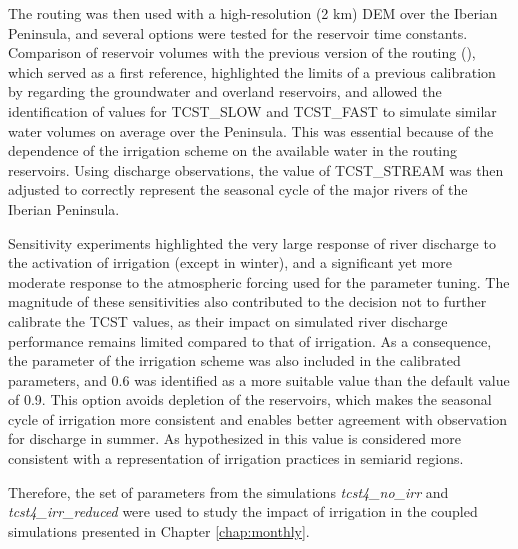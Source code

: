The \native routing was then used with a high-resolution (2 km) DEM over the Iberian Peninsula, and several options were tested for the reservoir time constants. 
Comparison of reservoir volumes with the previous version of the routing (\std), which served as a first reference, highlighted the limits of a previous calibration by \citet{kilic_evaluation_2023} regarding the groundwater and overland reservoirs, and allowed the identification of values for TCST\_SLOW and TCST\_FAST to simulate similar water volumes on average over the Peninsula. This was essential because of the dependence of the irrigation scheme on the available water in the routing reservoirs.
Using discharge observations, the value of TCST\_STREAM was then adjusted to correctly represent the seasonal cycle of the major rivers of the Iberian Peninsula.

Sensitivity experiments highlighted the very large response of river discharge to the activation of irrigation (except in winter), and a significant yet more moderate response to the atmospheric forcing used for the parameter tuning. 
The magnitude of these sensitivities also contributed to the decision not to further calibrate the TCST values, as their impact on simulated river discharge performance remains limited compared to that of irrigation.
As a consequence, the \betairrig parameter of the irrigation scheme was also included in the calibrated parameters, and 0.6 was identified as a more suitable value than the default value of 0.9. This option avoids depletion of the reservoirs, which makes the seasonal cycle of irrigation more consistent and enables better agreement with observation for discharge in summer. As hypothesized in \citet{arboleda-obando_validation_2024} this value is considered more consistent with a representation of irrigation practices in semiarid regions.

Therefore, the set of parameters from the simulations \textit{tcst4\_no\_irr} and \textit{tcst4\_irr\_reduced} were used to study the impact of irrigation in the coupled simulations presented in Chapter \ref{chap:monthly}.
